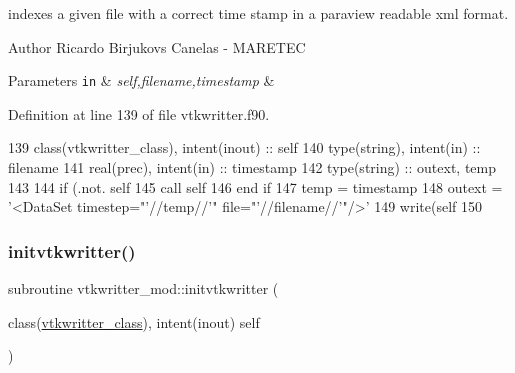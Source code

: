 indexes a given file with a correct time stamp in a paraview readable xml format. 

\begin{DoxyAuthor}{Author}
Ricardo Birjukovs Canelas -\/ M\+A\+R\+E\+T\+EC 
\end{DoxyAuthor}

\begin{DoxyParams}[1]{Parameters}
\mbox{\tt in}  & {\em self,filename,timestamp} & \\
\hline
\end{DoxyParams}


Definition at line 139 of file vtkwritter.\+f90.


\begin{DoxyCode}
139     \textcolor{keywordtype}{class}(vtkwritter\_class), \textcolor{keywordtype}{intent(inout)} :: self
140     \textcolor{keywordtype}{type}(string), \textcolor{keywordtype}{intent(in)} :: filename
141     \textcolor{keywordtype}{real(prec)}, \textcolor{keywordtype}{intent(in)} :: timestamp
142     \textcolor{keywordtype}{type}(string) :: outext, temp
143     
144     \textcolor{keywordflow}{if} (.not. self%
145         \textcolor{keyword}{call }self%
146 \textcolor{keywordflow}{    end if}
147     temp = timestamp
148     outext = \textcolor{stringliteral}{'<DataSet timestep="'}//temp//\textcolor{stringliteral}{'" file="'}//filename//\textcolor{stringliteral}{'"/>'}
149     \textcolor{keyword}{write}(self%
150     
\end{DoxyCode}
\mbox{\label{namespacevtkwritter__mod_abd35d591c8e15730a277b2d26deb83e8}} 
\subsubsection{\texorpdfstring{initvtkwritter()}{initvtkwritter()}}
{\footnotesize\ttfamily subroutine vtkwritter\+\_\+mod\+::initvtkwritter (\begin{DoxyParamCaption}\item[{class(\mbox{\hyperlink{structvtkwritter__mod_1_1vtkwritter__class}{vtkwritter\+\_\+class}}), intent(inout)}]{self }\end{DoxyParamCaption})\hspace{0.3cm}{\ttfamily [private]}}



